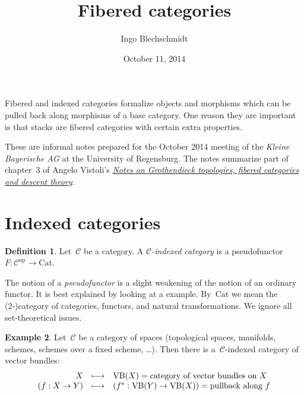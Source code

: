 \documentclass[a4paper,english,12pt]{scrartcl}
\theoremstyle{definition}
\newtheorem{defn}{Definition}[section]
\newtheorem{ex}[defn]{Example}
\theoremstyle{plain}
\theoremstyle{remark}
\newcommand{\C}{\mathcal{C}}
\newcommand{\op}{\mathrm{op}}
\newcommand{\Cat}{\mathrm{Cat}}
\newcommand{\VB}{\mathrm{VB}}
\begin{document}
\title{Fibered categories}
\author{Ingo Blechschmidt}
\date{October 11, 2014}
\maketitle

\begin{center}\begin{minipage}{0.8\textwidth}
Fibered and indexed categories formalize objects and morphisms
which can be pulled back along morphisms of a base category. One reason they
are important is that stacks are fibered categories with certain extra
properties.\medskip

These are informal notes prepared for the October 2014 meeting of the \emph{Kleine
Bayerische AG} at the University of Regensburg. The notes summarize part of
chapter~3 of Angelo Vistoli's
\href{http://homepage.sns.it/vistoli/descent.pdf}{\emph{Notes on Grothendieck
topologies, fibered categories and descent theory}}.
\end{minipage}\end{center}
\vspace{1em}

\tableofcontents

\section{Indexed categories}

\begin{defn}Let~$\C$ be a category. A \emph{$\C$-indexed category} is a
pseudofunctor~$F : \C^\op \to \Cat$.\end{defn}

The notion of a \emph{pseudofunctor} is a slight weakening of the notion of an
ordinary functor. It is best explained by looking at a example. By~$\Cat$ we
mean the (2-)category of categories, functors, and natural transformations. We
ignore all set-theoretical issues.

\begin{ex}\label{ex:vb}Let~$\C$ be a category of spaces (topological spaces,
manifolds, schemes, schemes over a fixed scheme, \ldots). Then there is
a~$\C$-indexed category of vector bundles:
\[ \begin{array}{@{}rcl@{}}
  X &\longmapsto& \VB(X) = \text{category of vector bundles on~$X$} \\
  (f : X \to Y) &\longmapsto&
    (f^* : \VB(Y) \to \VB(X)) = \text{pullback along~$f$}
\end{array} \]
\end{ex}
\end{document}
